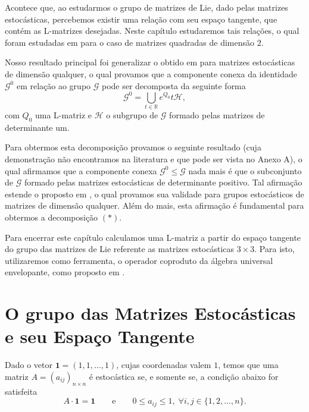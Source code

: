 \documentclass[twoside,openright,titlepage,numbers=noenddot,headinclude,  lineheaders footinclude=true,cleardoublepage=empty,
                                BCOR=5mm,paper=a4,fontsize=12pt ]{scrbook}
\theoremstyle{definition}
\begin{document}
Acontece que, ao estudarmos o grupo de matrizes de Lie, dado pelas matrizes estocásticas,
 percebemos existir uma relação com seu espaço tangente, que 
contém as L-matrizes desejadas. 
Neste capítulo estudaremos tais relações, o qual foram
estudadas em \cite{paper1} para o caso de matrizes quadradas de dimensão $2$.

Nosso resultado principal foi generalizar o obtido em \cite{paper1} para 
matrizes estocásticas de dimensão qualquer, o qual provamos que a componente
conexa da identidade $\mathcal{G}^0$ em relação ao grupo $\mathcal{G}$ pode ser decomposta da seguinte
forma
\begin{equation} \tag{$\ast$}
\mathcal{G}^0 = \bigcup_{t \in \mathbb{R}} e^{Q_0}t \mathcal{H},
\end{equation}
com $Q_0$ uma L-matriz e $\mathcal{H}$ o subgrupo de $\mathcal{G}$ formado pelas matrizes de determinante um.

Para obtermos esta decomposição
provamos o seguinte resultado (cuja demonstração não encontramos na literatura e que
pode ser vista no Anexo A), o qual afirmamos que
a componente
conexa $\mathcal{G}^0 \leq \mathcal{G}$ nada mais é que o subconjunto de $\mathcal{G}$ formado pelas matrizes
estocásticas de determinante positivo. Tal afirmação estende o proposto em \cite{paper1}, o qual
 provamos sua validade para grupos estocásticos de matrizes de dimensão qualquer. Além do mais, esta
afirmação é fundamental para obtermos a decomposição $(\ast)$.

 Para encerrar
este capítulo calculamos uma L-matriz a partir do espaço tangente do grupo das matrizes de
Lie referente as matrizes estocásticas $3 \times 3$. Para isto, utilizaremos
como ferramenta, o operador coproduto da álgebra universal envelopante, como proposto
em \cite{paper2}.

\section{O grupo das Matrizes Estoc\'asticas e seu Espa\c{c}o Tangente}
Dado o vetor $\mathbf{1} = (1, 1, \ldots, 1)$, cujas coordenadas
valem $1$, temos que uma matriz $A  = (a_{ij})_{n \times n}  $ é estocástica se,
e somente se, a condição abaixo for satisfeita
\[ A \cdot \mathbf{1} = \mathbf{1} \qquad \text{e} \qquad 0 \leq a_{ij} \leq 1, \; \forall i,j \in \{1, 2, \ldots, n \}. \]
\end{document}
